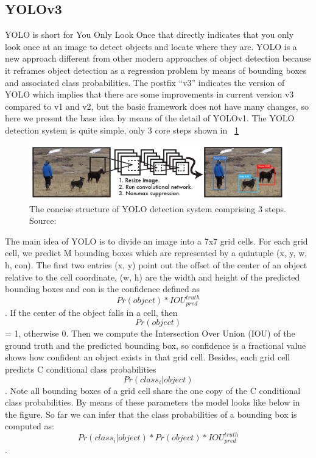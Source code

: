 \documentclass[runningheads]{llncs}
\begin{document}
\subsection{YOLOv3}
YOLO is short for You Only Look Once that directly indicates that you only look once at an image to detect objects and locate where they are. YOLO is a new approach different from other modern approaches of object detection because it reframes object detection as a regression problem by means of bounding boxes and associated class probabilities. The postfix “v3” indicates the version of YOLO which implies that there are some improvements in current version v3 compared to v1 and v2, but the basic framework does not have many changes, so here we present the base idea by means of the detail of YOLOv1. The YOLO detection system is quite simple, only 3 core steps shown in ~\ref{fig6}
\begin{figure}
\includegraphics[width=\textwidth]{figs/YOLO_System.png}
\caption{The concise structure of YOLO detection system comprising 3 steps. Source: ~\cite{ref_yolov1}} \label{fig6}
\end{figure}

The main idea of YOLO is to divide an image into a 7x7 grid cells. For each grid cell, we predict M bounding boxes which are represented by a quintuple (x, y, w, h, con). The first two entries (x, y) point out the offset of the center of an object relative to the cell coordinate, (w, h) are the width and height of the predicted bounding boxes and con is the confidence defined as $$Pr(object) * IOU_{pred}^{truth}$$. If the center of the object falls in a cell, then $$Pr(object)$$ = 1, otherwise 0. Then we compute the Intersection Over Union (IOU) of the ground truth and the predicted bounding box, so confidence is a fractional value shows how confident an object exists in that grid cell. Besides, each grid cell predicts C conditional class probabilities $$Pr(class_i|object)$$. Note all bounding boxes of a grid cell share the one copy of the C conditional class probabilities. By means of these parameters the model looks like below in the figure. So far we can infer that the class probabilities of a bounding box is computed as: $$Pr(class_i|object) * Pr(object) * IOU_{pred}^{truth}$$.
\end{document}

